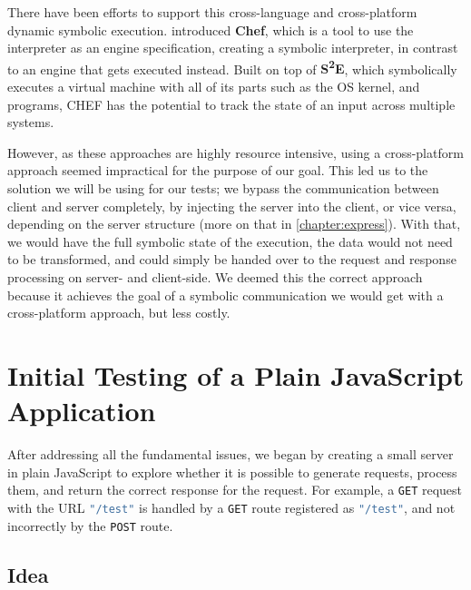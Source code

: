 There have been efforts to support this cross-language and cross-platform dynamic symbolic execution. \citet{bucur_prototyping_2014-1} introduced \textbf{Chef}, which is a tool to use the interpreter as an engine specification, creating a symbolic interpreter, in contrast to an engine that gets executed instead. Built on top of \textbf{S\textsuperscript{2}E}\cite{chipounov_s2e_2011}, which symbolically executes a virtual machine with all of its parts such as the OS kernel, and programs, CHEF has the potential to track the state of an input across multiple systems.


However, as these approaches are highly resource intensive, using a cross-platform approach seemed impractical for the purpose of our goal. This led us to the solution we will be using for our tests; we bypass the communication between client and server completely, by injecting the server into the client, or vice versa, depending on the server structure (more on that in \autoref{chapter:express}). With that, we would have the full symbolic state of the execution, the data would not need to be transformed, and could simply be handed over to the request and response processing on server- and client-side. 
We deemed this the correct approach because it achieves the goal of a symbolic communication we would get with a cross-platform approach, but less costly.


\section{Initial Testing of a Plain JavaScript Application}
\label{sec:init-test-plain}
After addressing all the fundamental issues, we began by creating a small server in plain JavaScript to explore whether it is possible to generate requests, process them, and return the correct response for the request. For example, a \texttt{GET} request with the URL \lstinline[language=JavaScript]+"/test"+ is handled by a \texttt{GET} route registered as \lstinline[language=JavaScript]{"/test"}, and not incorrectly by the \texttt{POST} route. 

\subsection{Idea}
\label{sec:idea}

